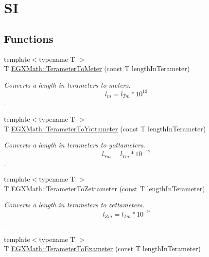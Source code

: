\hypertarget{group___e_g_x_math-_conversions-_length_conversions-_terameter-_s_i}{}\section{SI}
\label{group___e_g_x_math-_conversions-_length_conversions-_terameter-_s_i}
\subsection*{Functions}
\begin{DoxyCompactItemize}
\item 
{\footnotesize template$<$typename T $>$ }\\T \mbox{\hyperlink{group___e_g_x_math-_conversions-_length_conversions-_terameter-_s_i_ga34f2674bfcf8fb79eda27adf607d0876}{E\+G\+X\+Math\+::\+Terameter\+To\+Meter}} (const T length\+In\+Terameter)
\begin{DoxyCompactList}\small\item\em Converts a length in terameters to meters. \[ l_{m}=l_{Tm} * 10^{12} \]. \end{DoxyCompactList}\item 
{\footnotesize template$<$typename T $>$ }\\T \mbox{\hyperlink{group___e_g_x_math-_conversions-_length_conversions-_terameter-_s_i_gab0411fd993ebfe0b23de8d672203f68e}{E\+G\+X\+Math\+::\+Terameter\+To\+Yottameter}} (const T length\+In\+Terameter)
\begin{DoxyCompactList}\small\item\em Converts a length in terameters to yottameters. \[ l_{Ym}=l_{Tm} * 10^{-12} \]. \end{DoxyCompactList}\item 
{\footnotesize template$<$typename T $>$ }\\T \mbox{\hyperlink{group___e_g_x_math-_conversions-_length_conversions-_terameter-_s_i_gad897b4a8fd5405a7996ae3437194b030}{E\+G\+X\+Math\+::\+Terameter\+To\+Zettameter}} (const T length\+In\+Terameter)
\begin{DoxyCompactList}\small\item\em Converts a length in terameters to zettameters. \[ l_{Zm}=l_{Tm} * 10^{-9} \]. \end{DoxyCompactList}\item 
{\footnotesize template$<$typename T $>$ }\\T \mbox{\hyperlink{group___e_g_x_math-_conversions-_length_conversions-_terameter-_s_i_ga9b268bd91e8ba4853c2732b80bca0539}{E\+G\+X\+Math\+::\+Terameter\+To\+Exameter}} (const T length\+In\+Terameter)

\end{DoxyCompactItemize}
